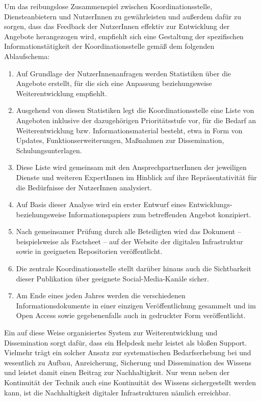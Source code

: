 \documentclass[a4paper,
fontsize=11pt,
oneside,
numbers=noperiodatend,
parskip=half-,
bibliography=totoc,
final
]{scrartcl}
\begin{document}
Um das reibungslose Zusammenspiel zwischen Koordinationsstelle,
Diensteanbietern und NutzerInnen zu gewährleisten und außerdem dafür zu
sorgen, dass das Feedback der NutzerInnen effektiv zur Entwicklung der
Angebote herangezogen wird, empfiehlt sich eine Gestaltung der
spezifischen Informationstätigkeit der Koordinationsstelle gemäß dem
folgenden Ablaufschema:

\begin{enumerate}
\def\labelenumi{\arabic{enumi}.}
\item
  Auf Grundlage der NutzerInnenanfragen werden Statistiken über die
  Angebote erstellt, für die sich eine Anpassung beziehungsweise
  Weiterentwicklung empfiehlt.
\item
  Ausgehend von diesen Statistiken legt die Koordinationsstelle eine
  Liste von Angeboten inklusive der dazugehörigen Prioritätsstufe vor,
  für die Bedarf an Weiterentwicklung bzw. Informationsmaterial besteht,
  etwa in Form von Updates, Funktionserweiterungen, Maßnahmen zur
  Dissemination, Schulungsunterlagen.
\item
  Diese Liste wird gemeinsam mit den AnsprechpartnerInnen der jeweiligen
  Dienste und weiteren ExpertInnen im Hinblick auf ihre
  Repräsentativität für die Bedürfnisse der NutzerInnen analysiert.
\item
  Auf Basis dieser Analyse wird ein erster Entwurf eines Entwicklungs-
  beziehungsweise Informationspapiers zum betreffenden Angebot
  konzipiert.
\item
  Nach gemeinsamer Prüfung durch alle Beteiligten wird das Dokument --
  beispielsweise als Factsheet -- auf der Website der digitalen
  Infrastruktur sowie in geeigneten Repositorien veröffentlicht.
\item
  Die zentrale Koordinationsstelle stellt darüber hinaus auch die
  Sichtbarkeit dieser Publikation über geeignete Social-Media-Kanäle
  sicher.
\item
  Am Ende eines jeden Jahres werden die verschiedenen
  Informationsdokumente in einer einzigen Veröffentlichung gesammelt und
  im Open Access sowie gegebenenfalls auch in gedruckter Form
  veröffentlicht.
\end{enumerate}

Ein auf diese Weise organisiertes System zur Weiterentwicklung und
Dissemination sorgt dafür, dass ein Helpdesk mehr leistet als bloßen
Support. Vielmehr trägt ein solcher Ansatz zur systematischen
Bedarfserhebung bei und wesentlich zu Aufbau, Anreicherung, Sicherung
und Dissemination des Wissens und leistet damit einen Beitrag zur
Nachhaltigkeit. Nur wenn neben der Kontinuität der Technik auch eine
Kontinuität des Wissens sichergestellt werden kann, ist die
Nachhaltigkeit digitaler Infrastrukturen nämlich erreichbar.
\end{document}
